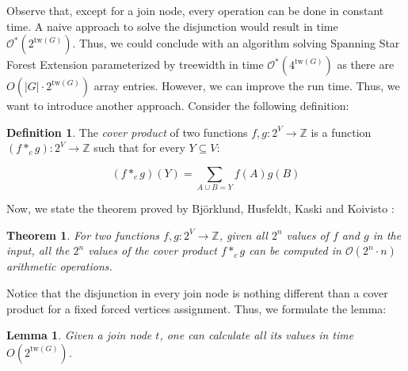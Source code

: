 \documentclass[en]{pracamgr}
\newtheorem{theorem}{Theorem}
\newtheorem{lemma}{Lemma}
\theoremstyle{definition}
\newtheorem{definition}{Definition}
\newcommand{\ssfep}{{\sc Spanning Star Forest Extension}}
\newcommand{\tw}{\textrm{tw}}
\begin{document}
Observe that, except for a join node, every operation can be done in constant time. A naive approach to solve the disjunction would result in time $\mathcal{O}^*(2^{\tw(G)})$. Thus, we could conclude with an algorithm solving \ssfep{} parameterized by treewidth in time $\mathcal{O}^*(4^{\tw(G)})$ as there are $O(|G| \cdot 2^{\tw(G)})$ array entries. However, we can improve the run time. Thus, we want to introduce another approach. Consider the following definition:

\begin{definition}
	The \textit{cover product} of two functions $f,g:2^V \rightarrow \mathbb{Z}$ is a function $(f *_c g):2^V \rightarrow \mathbb{Z}$ such that for every $Y \subseteq V$:
	
	\begin{equation*}
		(f *_c g)(Y) = \sum\limits_{ A \cup B = Y} f(A)g(B)
	\end{equation*}
\end{definition}

Now, we state the theorem proved by Björklund, Husfeldt, Kaski and Koivisto \cite{Cover product}:

\begin{theorem}\label{cproduct}
	For two functions $f,g:2^V \rightarrow \mathbb{Z}$, given all $2^n$ values of $f$ and $g$ in the input, all the $2^n$ values of the cover product $f*_cg$ can be computed in $\mathcal{O}(2^n\cdot n)$ arithmetic operations.
\end{theorem}

Notice that the disjunction in every join node is nothing different than a cover product for a fixed forced vertices assignment. Thus, we formulate the lemma:

\begin{lemma}\label{join lemma}
	Given a join node $t$, one can calculate all its values in time $O(2^{\tw(G)})$.
\end{lemma}
\end{document}
